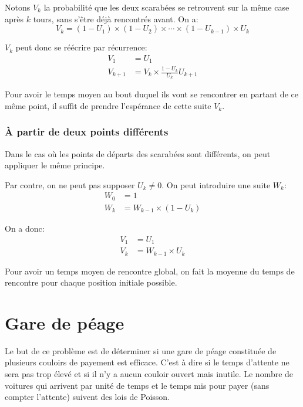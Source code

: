\documentclass{scrartcl}
\begin{document}
      Notons $V_k$ la probabilité que les deux scarabées se retrouvent sur la
      même case après $k$ tours, sans s'être déjà rencontrés avant. On a:
        \[V_k = (1 - U_1) \times (1 - U_2) \times \cdots \times (1 - U_{k - 1})
        \times U_k\]

      $V_k$ peut donc se réécrire par récurrence:
        \begin{align*}
          V_1       &= U_1 \\
          V_{k + 1} &= V_k \times \frac{1 - U_k}{U_k}U_{k + 1}
        \end{align*}

      Pour avoir le temps moyen au bout duquel ils vont se rencontrer en
      partant de ce même point, il suffit de prendre l'espérance de cette suite
      $V_k$. %

    \subsubsection{À partir de deux points différents}
      Dans le cas où les points de départs des scarabées sont différents, on peut
      appliquer le même principe.

      Par contre, on ne peut pas supposer $U_k \neq 0$.
      On peut introduire une suite $W_k$:
      \begin{align*}
        W_0 &= 1 \\
        W_k &= W_{k-1} \times (1 - U_k)
      \end{align*}

      On a donc:
      \begin{align*}
        V_1  &= U_1 \\
        V_k &= W_{k-1} \times U_k
      \end{align*}

      Pour avoir un temps moyen de rencontre global, on fait la moyenne du temps
      de rencontre pour chaque position initiale possible. %

\section{Gare de péage}
  Le but de ce problème est de déterminer si une gare de péage constituée de
  plusieurs couloirs de payement est efficace. C'est à dire si le temps
  d'attente ne sera pas trop élevé et si il n'y a aucun couloir ouvert mais
  inutile. Le nombre de voitures qui arrivent par unité de temps et le temps
  mis pour payer (sans compter l'attente) suivent des lois de Poisson.
\end{document}

